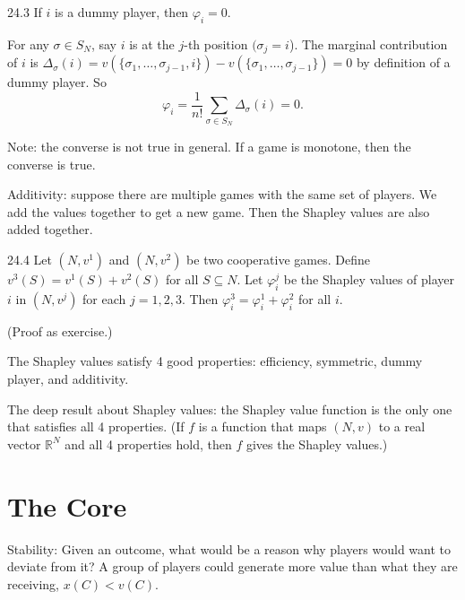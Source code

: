 \documentclass[12pt,letterpaper]{report}
\begin{document}
\begin{prop}{}{24.3}
  If $i$ is a dummy player, then $\varphi_i = 0$.
\end{prop}

\begin{thmproof}
  For any $\sigma \in S_N$, say $i$ is at the $j$-th position $(\sigma_j = i$).
  The marginal contribution of $i$ is $\Delta_\sigma(i) =
    v(\{\sigma_1, \ldots, \sigma_{j - 1}, i\}) - v(\{\sigma_1, \ldots, \sigma_{j - 1}\}) = 0$ by
  definition of a dummy player.
  So
  \[
    \varphi_i = \frac{1}{n!} \sum_{\sigma \in S_N} \Delta_\sigma(i) = 0.
  \]
\end{thmproof}

Note: the converse is not true in general.
If a game is monotone, then the converse is true.

\begin{enumcase}[start=4]
  \item
  Additivity: suppose there are multiple games with the same set of players.
  We add the values together to get a new game.
  Then the Shapley values are also added together.
\end{enumcase}

\begin{prop}{}{24.4}
  Let $(N, v^1)$ and $(N, v^2)$ be two cooperative games.
  Define $v^3(S) = v^1(S) + v^2(S)$ for all $S \subseteq N$.
  Let $\varphi_i^j$ be the Shapley values of player $i$ in $(N, v^j)$ for each $j = 1, 2, 3$.
  Then $\varphi_i^3 = \varphi_i^1 + \varphi_i^2$ for all $i$.
\end{prop}

(Proof as exercise.)

The Shapley values satisfy 4 good properties: efficiency, symmetric, dummy player, and additivity.

The deep result about Shapley values: the Shapley value function is the only one that satisfies all
4 properties.
(If $f$ is a function that maps $(N, v)$ to a real vector $\mathbb{R}^N$ and all 4 properties hold,
then $f$ gives the Shapley values.)

\section{The Core}

Stability: Given an outcome, what would be a reason why players would want to deviate from it?
A group of players could generate more value than what they are receiving, $x(C) < v(C)$.
\end{document}
